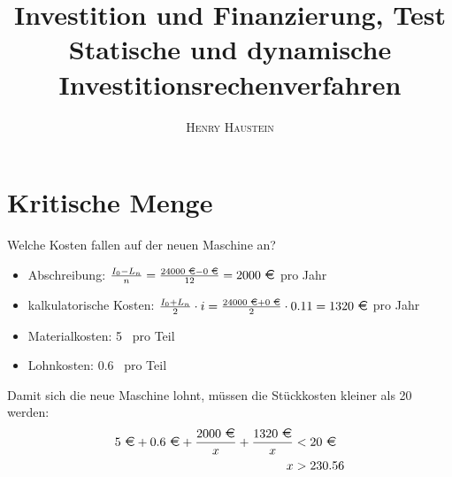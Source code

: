 \documentclass{article}
\title{\textbf{Investition und Finanzierung, Test Statische und dynamische Investitionsrechenverfahren}}
\author{\textsc{Henry Haustein}}
\date{}
\begin{document}
	\maketitle
	
	\section*{Kritische Menge}
	Welche Kosten fallen auf der neuen Maschine an?
	\begin{itemize}
		\item Abschreibung: $\frac{I_0-L_n}{n} = \frac{24000\text{ \EUR} - 0\text{ \EUR}}{12} = 2000\text{ \EUR}$ pro Jahr
		\item kalkulatorische Kosten: $\frac{I_0+L_n}{2} \cdot i = \frac{24000\text{ \EUR} + 0\text{ \EUR}}{2}\cdot 0.11 = 1320\text{ \EUR}$ pro Jahr
		\item Materialkosten: 5 \EUR\, pro Teil
		\item Lohnkosten: 0.6 \EUR\, pro Teil
	\end{itemize}
	Damit sich die neue Maschine lohnt, müssen die Stückkosten kleiner als 20 \EUR\, werden:
	\begin{align}
		5\text{ \EUR} + 0.6\text{ \EUR} + \frac{2000\text{ \EUR}}{x} + \frac{1320\text{ \EUR}}{x} &< 20\text{ \EUR} \notag \\
		x &> 230.56 \notag 
	\end{align}
	
\end{document}
